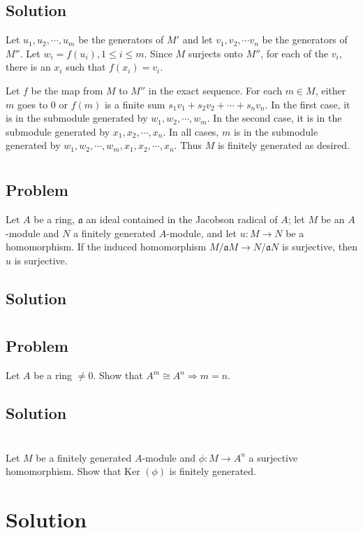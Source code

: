 \documentclass[book,12pt,oneside,openany]{memoir}
\begin{document}
\subsection{Solution}
Let $u_1, u_2, \cdots, u_m$ be the generators of $M'$ and let $v_1, v_2, \cdots v_n$ be the generators of $M''$. Let $w_i = f(u_i), 1 \leq i \leq m$. Since $M$ surjects onto $M''$, for each of the $v_i$, there is an $x_i$ such that $f(x_i) = v_i$.

Let $f$ be the map from $M$ to $M''$ in the exact sequence. For each $m \in M$, either $m$ goes to 0 or $f(m)$ is a finite sum $s_1 v_1 + s_2 v_2 + \cdots + s_n v_n$. In the first case, it is in the submodule generated by $w_1, w_2, \cdots, w_m$. In the second case, it is in the submodule generated by $x_1, x_2, \cdots, x_n$. In all cases, $m$ is in the submodule generated by $w_1, w_2, \cdots, w_m, x_1, x_2, \cdots, x_n$. Thus $M$ is finitely generated as desired.

\section{}
\subsection{Problem}
Let $A$ be a ring, $\mathfrak{a}$ an ideal contained in the Jacobson radical of $A$; let $M$ be an $A$-module and $N$ a finitely generated $A$-module, and let $u: M \rightarrow N$ be a homomorphism. If the induced homomorphism $M/\mathfrak{a}M \rightarrow N/\mathfrak{a}N$ is surjective, then $u$ is surjective.

\subsection{Solution}

\section{}
\subsection{Problem}
Let $A$ be a ring $\neq 0$. Show that $A^m \cong A^n \Rightarrow m = n$.

\subsection{Solution}

\section{}
Let $M$ be a finitely generated $A$-module and $\phi: M \rightarrow A^n$ a surjective homomorphism. Show that Ker $(\phi)$ is finitely generated.

\section{Solution}
\end{document}
